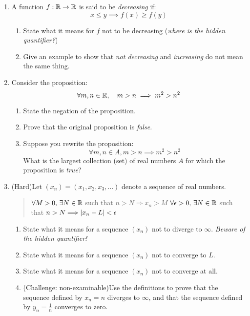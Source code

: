 \begin{exercises}{}{}
\begin{enumerate}
			
		\item\label{ex:decreasing} A function $f:\mathbb{R}\to\mathbb{R}$ is said to be \emph{decreasing} if:
		\[
			x\le y\implies f(x)\ge f(y)
		\]
		\begin{enumerate}
		  \item State what it means for $f$ not to be decreasing (\emph{where is the hidden quantifier?})
		  \item Give an example to show that \emph{not decreasing} and \emph{increasing} do not mean the same thing.
		\end{enumerate}
		
			
		\item Consider the proposition:
		\[
			\forall m,n\in\mathbb{R},\quad m>n\implies m^2>n^2
		\]
		\begin{enumerate}
	  	\item State the negation of the proposition.
	  	\item Prove that the original proposition is \emph{false.}
	  	\item Suppose you rewrite the proposition:
	  	\[\forall m,n\in A, m>n\implies m^2>n^2\]
	  	What is the largest collection (set) of real numbers $A$ for which the proposition is \emph{true}?
		\end{enumerate}
	
		
		\item (Hard)\lstsp Let $(x_n)=(x_1,x_2,x_3,\ldots)$ denote a sequence of real numbers.
		\begin{quote}
			$\forall M>0,\,\exists N\in\mathbb{R}$ such that $n>N\Longrightarrow x_n>M$\smallbreak
			$\forall\epsilon>0,\,\exists N\in\mathbb{R}$ such that $n>N\Longrightarrow \left| x_n-L\right|<\epsilon$
		\end{quote}
		\begin{enumerate}
		  \item State what it means for a sequence $(x_n)$ not to diverge to $\infty$. \emph{Beware of the hidden quantifier!}
		  \item State what it means for a sequence $(x_n)$ not to converge to $L$.
		  \item State what it means for a sequence $(x_n)$ not to converge at all.
		  \item (Challenge: non-examinable)\lstsp Use the definitions to prove that the sequence defined by $x_n=n$ diverges to $\infty$, and that the sequence defined by $y_n=\frac 1n$ converges to zero.
		\end{enumerate}
	
	\end{enumerate}

\end{exercises}

